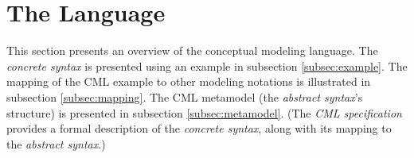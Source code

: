 \section{The Language}\label{sec:lang}
%
This section presents an overview of the conceptual modeling language.
The \emph{concrete syntax} is presented using an example in subsection \ref{subsec:example}.
The mapping of the CML example to other modeling notations is illustrated in subsection \ref{subsec:mapping}.
The CML metamodel (the \emph{abstract syntax}'s structure) is presented in subsection \ref{subsec:metamodel}.
(The \emph{CML specification} \cite{cml-spec} provides a formal description of the \emph{concrete syntax},
along with its mapping to the \emph{abstract syntax}.)




